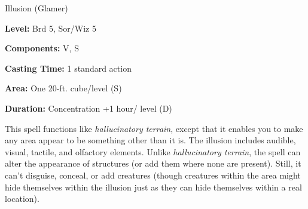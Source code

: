 
Illusion (Glamer)

\textbf{Level:} Brd 5, Sor/Wiz 5

\textbf{Components:} V, S

\textbf{Casting Time:} 1 standard action

\textbf{Area:} One 20-ft. cube/level (S)

\textbf{Duration:} Concentration +1 hour/ level (D)

This spell functions like \textit{hallucinatory terrain}, except that it enables 
you to make any area appear to be something other than it is. The illusion includes 
audible, visual, tactile, and olfactory elements. Unlike \textit{hallucinatory 
terrain}, the spell can alter the appearance of structures (or add them where none 
are present). Still, it can't disguise, conceal, or add creatures (though creatures 
within the area might hide themselves within the illusion just as they can hide 
themselves within a real location).

